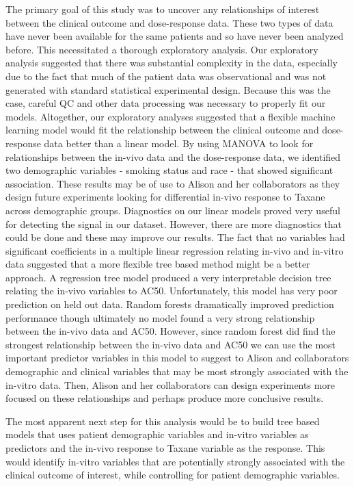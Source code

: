 \documentclass[12pt]{article}
\begin{document}
The primary goal of this study was to uncover any relationships of interest between the clinical outcome and dose-response data. These two types of data have never been available for the same patients and so have never been analyzed before.  This necessitated a thorough exploratory analysis.  Our exploratory analysis suggested that there was substantial complexity in the data, especially due to the fact that much of the patient data was observational and was not generated with standard statistical experimental design.  Because this was the case, careful QC and other data processing was necessary to properly fit our models. Altogether, our exploratory analyses suggested that a flexible machine learning model would fit the relationship between the clinical outcome and dose-response data better than a linear model.  By using MANOVA to look for relationships between the in-vivo data and the dose-response data, we identified two demographic variables - smoking status and race - that showed significant association.  These results may be of use to Alison and her collaborators as they design future experiments looking for differential in-vivo response to Taxane across demographic groups. Diagnostics on our linear models proved very useful for detecting the signal in our dataset.  However, there are more diagnostics that could be done and these may improve our results.  The fact that no variables had significant coefficients in a multiple linear regression relating in-vivo and in-vitro data suggested that a more flexible tree based method might be a better approach.  A regression tree model produced a very interpretable decision tree relating the in-vivo variables to AC50.  Unfortunately, this model has very poor prediction on held out data.  Random forests dramatically improved prediction performance though ultimately no model found a very strong relationship between the in-vivo data and AC50.  However, since random forest did find the strongest relationship between the in-vivo data and AC50 we can use the most important predictor variables in this model to suggest to Alison and collaborators demographic and clinical variables that may be most strongly associated with the in-vitro data. Then, Alison and her collaborators can design experiments more focused on these relationships and perhaps produce more conclusive results.  

The most apparent next step for this analysis would be to build tree based models that uses patient demographic variables and in-vitro variables as predictors and the in-vivo response to Taxane variable as the response.  This would identify in-vitro variables that are potentially strongly associated with the clinical outcome of interest, while controlling for patient demographic variables.
\end{document}
